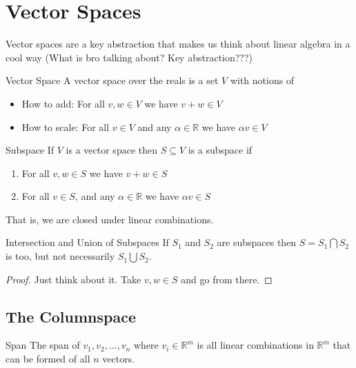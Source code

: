 \documentclass[11pt]{article}
\begin{document}
\section{Vector Spaces}
Vector spaces are a key abstraction that makes us think about linear algebra in a cool way (What is
bro talking about? Key abstraction???)

\begin{definitionbox}{Vector Space}
    A vector space over the reals is a set $V$ with notions of

    \begin{itemize}
        \item How to add: For all $v,w \in V$ we have $v+w \in V$
        \item How to scale: For all $v \in V$ and any $\alpha \in \mathbb{R}$ we have 
            $\alpha v \in V$
    \end{itemize}
\end{definitionbox}

\begin{definitionbox}{Subspace}
    If $V$ is a vector space then $S \subseteq V$ is a subspace if
    \begin{enumerate}
        \item For all $v,w \in S$ we have $v+w \in S$
        \item For all $v \in S$, and any $\alpha \in \mathbb{R}$ we have $\alpha v \in S$
    \end{enumerate}
    That is, we are closed under linear combinations.
\end{definitionbox}

\begin{theorembox}{Intersection and Union of Subspaces}
    If $S_1$ and $S_2$ are subspaces then $S=S_1 \bigcap S_2$ is too, but not necessarily
    $S_1 \bigcup S_2$.
\end{theorembox}

\begin{proof}
    Just think about it. Take $v,w \in S$ and go from there.
\end{proof}

\subsection{The Columnspace}
\begin{definitionbox}{Span}
    The span of $v_1, v_2, ..., v_n$ where $v_i \in \mathbb{R}^m$ is all linear combinations in
    $\mathbb{R}^m$ that can be formed of all $n$ vectors.
\end{definitionbox}
\end{document}
